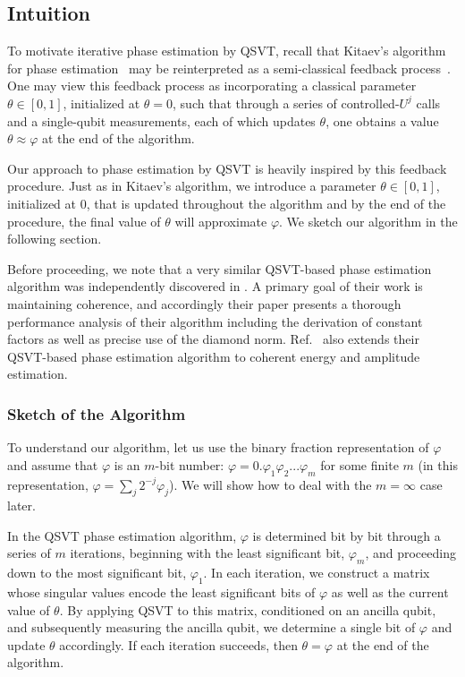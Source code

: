 \documentclass[aps,pra,showpacs,notitlepage,twocolumn,superscriptaddress,nofootinbib]{revtex4-1}
\begin{document}
\subsection{Intuition}\label{sec:PhaseEstimation_Motivation}
    To motivate iterative phase estimation by QSVT, recall that Kitaev's algorithm for phase estimation~\cite{kitaev2002classical, kitaev1995quantum} may be reinterpreted as a semi-classical feedback process~\cite{Parker_2000, Monz_2016}. One may view this feedback process as incorporating a classical parameter $\theta \in [0,1]$, initialized at $\theta = 0$, such that through a series of controlled-$U^j$ calls and a single-qubit measurements, each of which updates $\theta$, one obtains a value $\theta \approx \varphi$ at the end of the algorithm.
    
    Our approach to phase estimation by QSVT is heavily inspired by this feedback procedure. Just as in Kitaev's algorithm, we introduce a parameter $\theta \in [0,1]$, initialized at $0$, that is updated throughout the algorithm and by the end of the procedure, the final value of $\theta$ will approximate $\varphi$. We sketch our algorithm in the following section. 
    
    Before proceeding, we note that a very similar QSVT-based phase estimation algorithm was independently discovered in \cite{rall2021faster}. A primary goal of their work is maintaining coherence, and accordingly their paper presents a thorough performance analysis of their algorithm including the derivation of constant factors as well as precise use of the diamond norm. Ref.~\cite{rall2021faster} also extends their QSVT-based phase estimation algorithm to coherent energy and amplitude estimation.

    
    \subsubsection{Sketch of the Algorithm}\label{sec:PhaseEstimation_Sketch}
    To understand our algorithm, let us use the binary fraction representation of $\varphi$ and assume that $\varphi$ is an $m$-bit number: $\varphi = 0.\varphi_1 \varphi_2 ... \varphi_m$ for some finite $m$ (in this representation, $\varphi = \sum_j 2^{-j} \varphi_j$). We will show how to deal with the $m = \infty$ case later. 
    
    In the QSVT phase estimation algorithm, $\varphi$ is determined bit by bit through a series of $m$ iterations, beginning with the least significant bit, $\varphi_m$, and proceeding down to the most significant bit, $\varphi_1$. In each iteration, we construct a matrix whose singular values encode the least significant bits of $\varphi$ as well as the current value of $\theta$. By applying QSVT to this matrix, conditioned on an ancilla qubit, and subsequently measuring the ancilla qubit, we determine a single bit of $\varphi$ and update $\theta$ accordingly. If each iteration succeeds, then $\theta = \varphi$ at the end of the algorithm.
        
\end{document}
